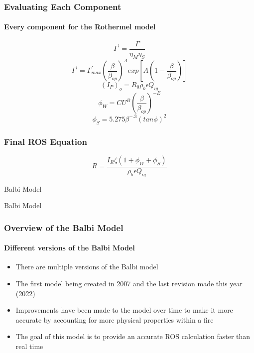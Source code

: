 \documentclass{beamer}
\begin{document}
	\begin{frame}
			\frametitle{Evaluating Each Component}
	\framesubtitle{Every component for the Rothermel model}
	 \begin{equation}
 	\label{gamma '}
 	\Gamma ^ {'} = \frac {\Gamma} {\eta _ M \eta _ S}
 \end{equation}
\begin{equation}
	\label{Final Reaction Velocity}
	\Gamma ^ {'} = \Gamma ^ {'}_{max} (\frac {\beta} {\beta _ {op}}) ^ {A} exp[A(1 - \frac {\beta} {\beta _ {op}})]
\end{equation}
\begin{equation}
	\label{Propagating flux with i0}
	(I_P)_o = R_0 \rho _ b \epsilon Q_{ig}
\end{equation}
	\begin{equation}
	\label{wind coefficient}
	\phi _ W = C U^{B} (\frac {\beta} {\beta_{op}}) ^ {-E}
\end{equation}
\begin{equation}
	\label{Slope coefficient}
	\phi _ S = 5.275 \beta ^ {-.3} (tan \phi)^{2}
\end{equation}
	\end{frame}

\begin{frame}
		\frametitle{Final ROS Equation}
	\begin{equation}
	\label{rothermel final ROS} 
	R = \frac {I_R \zeta (1 + \phi _ W + \phi _ S )} {\rho _ b \epsilon Q_{ig}}
\end{equation}
\end{frame}
	
\begin{frame} {Balbi Model}
\begin{center}
{\fontsize{40}{50}\selectfont Balbi Model}
\end{center}
\end{frame}

	\begin{frame}

	\frametitle{Overview of the Balbi Model}
	\framesubtitle{Different versions of the Balbi Model}
	\begin{itemize}
	\setlength{\itemsep}{7mm}
		\item There are multiple versions of the Balbi model
		\item The first model being created in 2007 and the last revision made this year (2022)
		\item Improvements have been made to the model over time to make it more accurate by accounting for more physical properties within a fire
		\item The goal of this model is to provide an accurate ROS calculation faster than real time
	\end{itemize}
	\end{frame}
	
\end{document}
